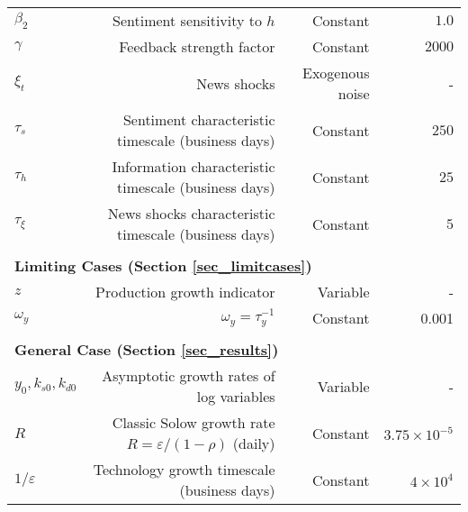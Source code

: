 \begin{table}[H]
\begin{tabular}{lrrr}
$\beta_2$    &  Sentiment sensitivity to $h$ &  Constant& $1.0$ \\
$\gamma$    &  Feedback strength factor  &  Constant& $2000$ \\
$\xi_t$    &  News shocks  & Exogenous noise &- \\
$\tau_s$    & Sentiment characteristic timescale (business days) & Constant & $250$ \\
$\tau_h$    & Information characteristic timescale (business days)  & Constant & $25$ \\
$\tau_\xi$    & News shocks characteristic timescale (business days) & Constant & $5$ \\\\
\multicolumn{4}{l}{\textbf{Limiting Cases (Section \ref{sec_limitcases})}}\\
$z$    & Production growth indicator & Variable &- \\
$\omega_y$ & $\omega_y=\tau_y^{-1}$ & Constant & 0.001\\\\

\multicolumn{4}{l}{\textbf{General Case (Section \ref{sec_results})}}\\
$y_0, k_{s0}, k_{d0}$ & Asymptotic growth rates of log variables & Variable & -\\
$R$ & Classic Solow growth rate $R=\varepsilon/(1-\rho)$ (daily) & Constant & $3.75\times10^{-5}$\\
$1/\varepsilon$ &Technology growth timescale (business days) & Constant & $4\times10^{4}$\\
\bottomrule
\end{tabular}
\end{table}